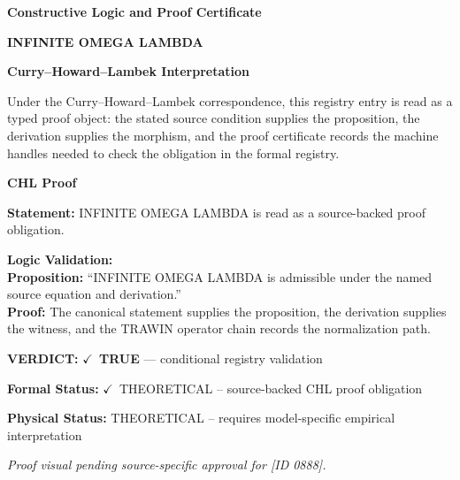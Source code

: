 \clearpage
\begingroup\tzpsupportsetup
\noindent\textbf{\fontsize{10.8pt}{12.8pt}\selectfont [ID 0888] Constructive Logic and Proof Certificate}\par
\noindent\textbf{\fontsize{10pt}{12pt}\selectfont INFINITE OMEGA LAMBDA}\par
\vspace{0.45em}
\begingroup
\footnotesize
\setlength{\parskip}{0.22em}
\setlength{\parindent}{0pt}
\noindent\textbf{Curry--Howard--Lambek Interpretation}\par
Under the Curry--Howard--Lambek correspondence, this registry entry is read as a typed proof
object: the stated source condition supplies the proposition, the derivation supplies the
morphism, and the proof certificate records the machine handles needed to check the obligation
in the formal registry.

\vspace{0.45em}
\noindent\textbf{CHL Proof}\par
\textbf{Statement:} INFINITE OMEGA LAMBDA is read as a source-backed proof obligation.

\textbf{Logic Validation:}\\
\textbf{Proposition:} ``INFINITE OMEGA LAMBDA is admissible under the named source equation and derivation.''\\
\textbf{Proof:} The canonical statement supplies the proposition, the derivation supplies the witness, and the TRAWIN operator chain records the normalization path.

\textbf{VERDICT:} \ensuremath{\checkmark}\ \textbf{TRUE} --- conditional registry validation

\textbf{Formal Status:} \ensuremath{\checkmark}\ THEORETICAL -- source-backed CHL proof obligation

\textbf{Physical Status:} THEORETICAL -- requires model-specific empirical interpretation
\par\vspace{0.45em}
\par
\vfill
\begingroup\footnotesize\itshape
Proof visual pending source-specific approval for [ID 0888].
\par\endgroup
\vfill
\endgroup
\endgroup
